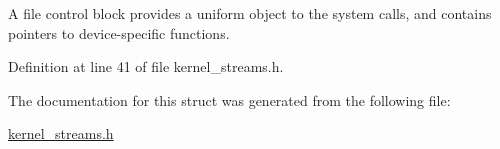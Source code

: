 A file control block provides a uniform object to the system calls, and contains pointers to device-\/specific functions. 

Definition at line 41 of file kernel\+\_\+streams.\+h.



The documentation for this struct was generated from the following file\+:\begin{DoxyCompactItemize}
\item 
\hyperlink{kernel__streams_8h}{kernel\+\_\+streams.\+h}\end{DoxyCompactItemize}
